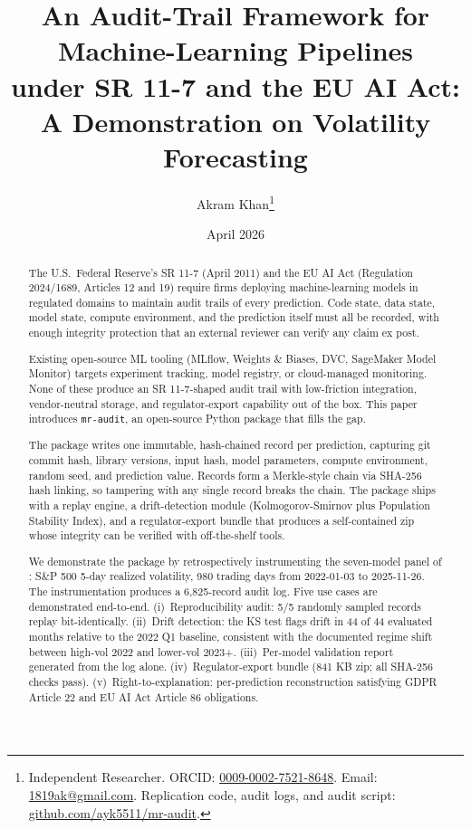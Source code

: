 \documentclass[12pt,a4paper]{article}
\title{An Audit-Trail Framework for Machine-Learning Pipelines\\
under SR 11-7 and the EU AI Act:\\
A Demonstration on Volatility Forecasting}
\author{
    Akram Khan\thanks{Independent Researcher. ORCID: \href{https://orcid.org/0009-0002-7521-8648}{0009-0002-7521-8648}. Email: \href{mailto:1819ak@gmail.com}{1819ak@gmail.com}. Replication code, audit logs, and audit script: \href{https://github.com/ayk5511/mr-audit}{github.com/ayk5511/mr-audit}.}
}
\date{April 2026}
\begin{document}
\maketitle

\begin{abstract}
The U.S.\ Federal Reserve's SR 11-7 (April 2011) and the EU AI Act (Regulation 2024/1689, Articles 12 and 19) require firms deploying machine-learning models in regulated domains to maintain audit trails of every prediction. Code state, data state, model state, compute environment, and the prediction itself must all be recorded, with enough integrity protection that an external reviewer can verify any claim ex post.

Existing open-source ML tooling (MLflow, Weights \& Biases, DVC, SageMaker Model Monitor) targets experiment tracking, model registry, or cloud-managed monitoring. None of these produce an SR 11-7-shaped audit trail with low-friction integration, vendor-neutral storage, and regulator-export capability out of the box. This paper introduces \texttt{mr-audit}, an open-source Python package that fills the gap.

The package writes one immutable, hash-chained record per prediction, capturing git commit hash, library versions, input hash, model parameters, compute environment, random seed, and prediction value. Records form a Merkle-style chain via SHA-256 hash linking, so tampering with any single record breaks the chain. The package ships with a replay engine, a drift-detection module (Kolmogorov-Smirnov plus Population Stability Index), and a regulator-export bundle that produces a self-contained zip whose integrity can be verified with off-the-shelf tools.

We demonstrate the package by retrospectively instrumenting the seven-model panel of \citet{KhanVol2026}: S\&P 500 5-day realized volatility, 980 trading days from 2022-01-03 to 2025-11-26. The instrumentation produces a 6{,}825-record audit log. Five use cases are demonstrated end-to-end. (i)~Reproducibility audit: 5/5 randomly sampled records replay bit-identically. (ii)~Drift detection: the KS test flags drift in 44 of 44 evaluated months relative to the 2022 Q1 baseline, consistent with the documented regime shift between high-vol 2022 and lower-vol 2023+. (iii)~Per-model validation report generated from the log alone. (iv)~Regulator-export bundle (841 KB zip; all SHA-256 checks pass). (v)~Right-to-explanation: per-prediction reconstruction satisfying GDPR Article 22 and EU AI Act Article 86 obligations.


\end{abstract}
\end{document}
